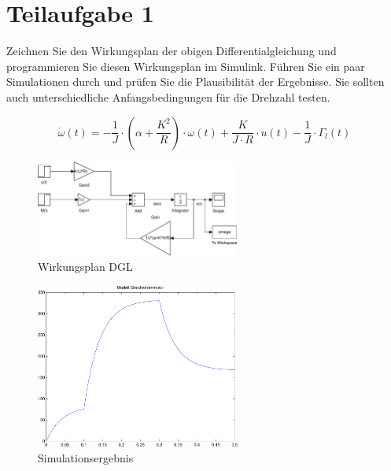 \section{Teilaufgabe 1}
\begin{aufgabe}
    Zeichnen Sie den Wirkungsplan der obigen Differentialgleichung und 
    programmieren Sie diesen Wirkungsplan im Simulink. Führen Sie ein paar 
    Simulationen durch und prüfen Sie die Plausibilität der Ergebnisse. Sie 
    sollten auch unterschiedliche Anfangsbedingungen für die Drehzahl testen.
\end{aufgabe}
\[ \dot{\omega}(t) 
    = -\frac{1}{J} \cdot \left(\alpha + \frac{K^2}{R}\right) \cdot \omega(t) 
    + \frac{K}{J \cdot R} \cdot u(t) - \frac{1}{J} \cdot \Gamma_l(t) \]
\begin{figure}[h!]
    \centering
    \includegraphics[width=0.6\textwidth]{01/wirkungsplan.pdf}
    \caption{Wirkungsplan DGL}
    \label{fig:01}
\end{figure}
\begin{figure}[h!]
    \centering
    \includegraphics[width=0.6\textwidth]{01/wirkungsplan_plot.pdf}
    \caption{Simulationsergebnis}
    \label{fig:01plot}
\end{figure}

